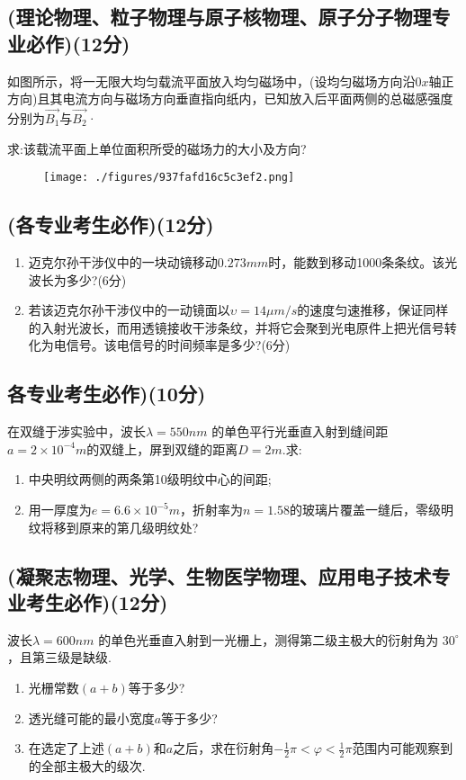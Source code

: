 \subsection{(理论物理、粒子物理与原子核物理、原子分子物理专业必作)(12分)}
如图所示，将一无限大均匀载流平面放入均匀磁场中，(设均匀磁场方向沿$0x$轴正方向)且其电流方向与磁场方向垂直指向纸内，已知放入后平面两侧的总磁感强度分别为$\vec{B_1}$与$\vec{B_2}$·

求:该载流平面上单位面积所受的磁场力的大小及方向?
\begin{figure}[ht]
\centering
\texttt{[image: ./figures/937fafd16c5c3ef2.png]}
\caption{} \label{fig_CD07_2}
\end{figure}
\subsection{(各专业考生必作)(12分)}
\begin{enumerate}
\item 迈克尔孙干涉仪中的一块动镜移动$0.273mm$时，能数到移动1000条条纹。该光波长为多少?(6分)
\item 若该迈克尔孙干涉仪中的一动镜面以$\upsilon=14\mu m/s$的速度匀速推移，保证同样的入射光波长，而用透镜接收干涉条纹，并将它会聚到光电原件上把光信号转化为电信号。该电信号的时间频率是多少?(6分)
\end{enumerate}
\subsection{各专业考生必作)(10分)}
在双缝于涉实验中，波长$\lambda=550nm$ 的单色平行光垂直入射到缝间距$a=2\times10^{-4}m$的双缝上，屏到双缝的距离$D=2m$.求:
\begin{enumerate}
\item 中央明纹两侧的两条第10级明纹中心的间距;
\item 用一厚度为$e=6.6\times10^{-5}m$，折射率为$n=1.58$的玻璃片覆盖一缝后，零级明纹将移到原来的第几级明纹处?
\end{enumerate}
\subsection{(凝聚志物理、光学、生物医学物理、应用电子技术专业考生必作)(12分)}
波长$\lambda=600nm$ 的单色光垂直入射到一光栅上，测得第二级主极大的衍射角为 $30^\circ$，且第三级是缺级.
\begin{enumerate}
\item 光栅常数$(a+b)$等于多少?
\item 透光缝可能的最小宽度$a$等于多少?
\item 在选定了上述$(a+b)$和$a$之后，求在衍射角$-\frac{1}{2}\pi<\varphi<\frac{1}{2}\pi$范围内可能观察到的全部主极大的级次.
\end{enumerate}
